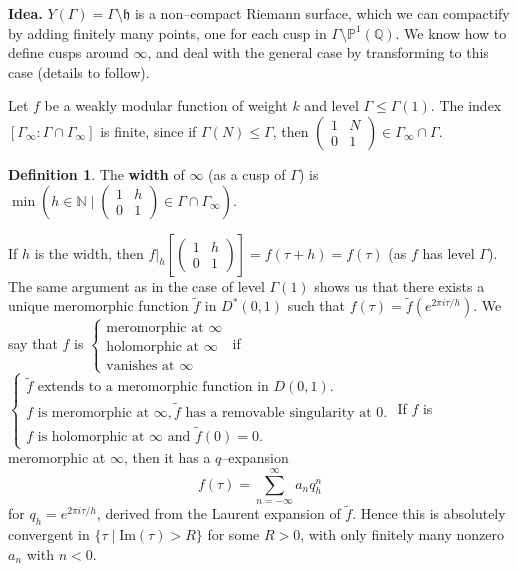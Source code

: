 \documentclass{article}
\theoremstyle{definition}
\newtheorem{defn}{Definition}[section]
\begin{document}
\textbf{Idea.} $Y(\Gamma) = \Gamma\setminus \mathfrak{h}$ is a non--compact Riemann surface, which we can compactify by adding finitely many points, one for each cusp in $\Gamma\setminus \mathbb{P}^1(\mathbb{Q})$. We know how to define cusps around $\infty$, and deal with the general case by transforming to this case (details to follow).
\vspace{1mm}
 
Let $f$ be a weakly modular function of weight $k$ and level $\Gamma\le \Gamma(1)$. The index $[\Gamma_{\infty}: \Gamma \cap \Gamma_{\infty}]$ is finite, since if $\Gamma(N)\le \Gamma$, then $\begin{pmatrix} 1&N\\0&1 \end{pmatrix} \in \Gamma_{\infty} \cap \Gamma$.  
\begin{defn}
    The \textbf{width} of $\infty$ (as a cusp of $\Gamma$) is $\min \left(h \in \mathbb{N} \mid \begin{pmatrix} 1&h\\0&1 \end{pmatrix} \in \Gamma \cap \Gamma_{\infty}\right)$.
\end{defn}
If $h$ is the width, then $f|_h\left[\begin{pmatrix} 1 & h\\0&1 \end{pmatrix}\right] = f(\tau+h) = f(\tau)$ (as $f$ has level $\Gamma$). The same argument as in the case of level $\Gamma(1)$ shows us that there exists a unique meromorphic function $\tilde{f}$ in $D^*(0,1)$ such that $f(\tau) = \tilde{f}(e^{2\pi i \tau/h})$. We say that $f$ is $\begin{cases}
    \text{meromorphic at }\infty\\
    \text{holomorphic at }\infty\\
    \text{vanishes at }\infty
\end{cases}$ if $\begin{cases}
    \tilde{f}\text{ extends to a meromorphic function in }D(0,1).\\
    f\text{ is meromorphic at }\infty, \tilde{f} \text{ has a removable singularity at 0}.\\
    f\text{ is holomorphic at }\infty \text{ and }\tilde{f}(0)=0.
\end{cases}$
If $f$ is meromorphic at $\infty$, then it has a $q$--expansion $$f(\tau) = \sum_{n=-\infty}^{\infty} a_n q_h^n$$ for $q_h = e^{2\pi i \tau/h}$, derived from the Laurent expansion of $\tilde{f}$. Hence this is absolutely convergent in $\{\tau \mid \text{Im}(\tau)>R\}$ for some $R>0$, with only finitely many nonzero $a_n$ with $n<0$.
\vspace{1mm}
 
\end{document}
